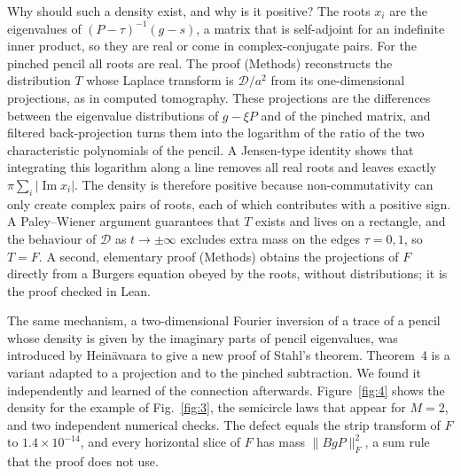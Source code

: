 \documentclass[11pt]{article}
\renewcommand{\Im}{\operatorname{Im}}
\begin{document}
Why should such a density exist, and why is it positive? The roots $x_i$ are the eigenvalues of
$(P-\tau)^{-1}(g-s)$, a matrix that is self-adjoint for an indefinite inner product, so they are real or come in
complex-conjugate pairs. For the pinched pencil all roots are real. The proof (Methods) reconstructs the distribution
$T$ whose Laplace transform is $\mathcal{D}/a^2$ from its one-dimensional projections, as in computed
tomography\cite{Natterer1986}. These projections are the differences between the eigenvalue distributions of $g-\xi P$
and of the pinched matrix, and filtered back-projection turns them into the logarithm of the ratio of the two
characteristic polynomials of the pencil. A Jensen-type identity shows that integrating this logarithm along a line
removes all real roots and leaves exactly $\pi\sum_i|\Im x_i|$. The density is therefore positive because
non-commutativity can only create complex pairs of roots, each of which contributes with a positive sign. A
Paley--Wiener argument\cite{Hormander1990} guarantees that $T$ exists and lives on a rectangle, and the behaviour of
$\mathcal{D}$ as $t\to\pm\infty$ excludes extra mass on the edges $\tau=0,1$, so $T=F$. A second, elementary proof
(Methods) obtains the projections of $F$ directly from a Burgers equation obeyed by the roots, without distributions;
it is the proof checked in Lean.

The same mechanism, a two-dimensional Fourier inversion of a trace of a pencil whose density is given by the imaginary
parts of pencil eigenvalues, was introduced by Hein\"avaara to give a new proof of Stahl's theorem\cite{Heinavaara2023}.
Theorem~4 is a variant adapted to a projection and to the pinched subtraction. We found it independently and learned of
the connection afterwards. Figure~\ref{fig:4} shows the density for the example of Fig.~\ref{fig:3}, the semicircle
laws that appear for $M=2$, and two independent numerical checks. The defect equals the strip transform of $F$ to
$1.4\times10^{-14}$, and every horizontal slice of $F$ has mass $\|BgP\|_F^2$, a sum rule that the proof does not use.
\end{document}

